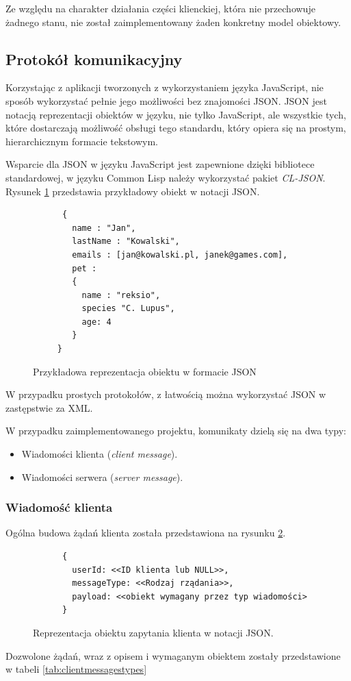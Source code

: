 Ze względu na charakter działania części klienckiej, która nie przechowuje żadnego stanu, nie został zaimplementowany żaden konkretny model obiektowy.

\subsection{Protokół komunikacyjny}

Korzystając z aplikacji tworzonych z wykorzystaniem języka JavaScript, nie sposób wykorzystać pełnie jego możliwości bez znajomości JSON. JSON jest notacją reprezentacji obiektów w języku, nie tylko JavaScript, ale wszystkie tych, które dostarczają możliwość obsługi tego standardu, który opiera się na prostym, hierarchicznym formacie tekstowym.

Wsparcie dla JSON w języku JavaScript jest zapewnione dzięki bibliotece standardowej, w języku Common Lisp należy wykorzystać pakiet \emph{CL-JSON}. Rysunek \ref{fig:jsonexample} przedstawia przykładowy obiekt w notacji JSON.
\begin{figure}[ht]
    \centering
    \begin{verbatim}
      {
        name : "Jan",
        lastName : "Kowalski",
        emails : [jan@kowalski.pl, janek@games.com],
        pet :
        {
          name : "reksio",
          species "C. Lupus",
          age: 4
        }
     }
      \end{verbatim}
    \caption{Przykładowa reprezentacja obiektu w formacie JSON}
    \label{fig:jsonexample}
\end{figure}
W przypadku prostych protokołów, z łatwością można wykorzystać JSON w zastępstwie za XML.

W przypadku zaimplementowanego projektu, komunikaty dzielą się na dwa typy:
\begin{itemize}
  \item Wiadomości klienta (\emph{client message}).
  \item Wiadomości serwera (\emph{server message}).
\end{itemize}

\subsubsection{Wiadomość klienta}
Ogólna budowa żądań klienta została przedstawiona na rysunku \ref{fig:jsonclient}.
\begin{figure}[ht]
    \centering
    \begin{verbatim}
      {
        userId: <<ID klienta lub NULL>>,
        messageType: <<Rodzaj rządania>>,
        payload: <<obiekt wymagany przez typ wiadomości>
      }
      \end{verbatim}
    \caption{Reprezentacja obiektu zapytania klienta w notacji JSON.}
    \label{fig:jsonclient}
\end{figure}
Dozwolone żądań, wraz z opisem i wymaganym obiektem zostały przedstawione w tabeli \ref{tab:clientmessagestypes}

